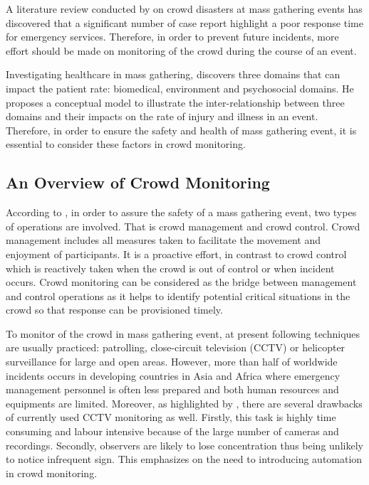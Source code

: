 A literature review conducted by \citet{Soomaroo2012} on crowd disasters at mass gathering events has discovered that a significant number of case report highlight a poor response time for emergency services. Therefore, in order to prevent future incidents, more effort should be made on monitoring of the crowd during the course of an event. 

Investigating healthcare in mass gathering, \citet{Arbon2004} discovers three domains that can impact the patient rate: biomedical, environment and psychosocial domains. He proposes a conceptual model to illustrate the inter-relationship between three domains and their impacts on the rate of injury and illness in an event. Therefore, in order to ensure the safety and health of mass gathering event, it is essential to consider these factors in crowd monitoring.

\subsection{An Overview of Crowd Monitoring}

According to \citet{Berlonghi1995}, in order to assure the safety of a mass gathering event, two types of operations are involved. That is crowd management and crowd control. Crowd management includes all measures taken to facilitate the movement and enjoyment of participants. It is a proactive effort, in contrast to crowd control which is reactively taken when the crowd is out of control or when incident occurs. Crowd monitoring can be considered as the bridge between management and control operations as it helps to identify potential critical situations in the crowd so that response can be provisioned timely.

To monitor of the crowd in mass gathering event, at present following techniques are usually practiced: patrolling, close-circuit television (CCTV) or helicopter surveillance for large and open areas. However, more than half of worldwide incidents occurs in developing countries in Asia and Africa \citep{BurkleJr2011} where emergency management personnel is often less prepared and both human resources and equipments are limited. Moreover, as highlighted by \citet{Davies1995}, there are several drawbacks of currently used CCTV monitoring as well. Firstly, this task is highly time consuming and labour intensive because of the large number of cameras and recordings. Secondly, observers are likely to lose concentration thus being unlikely to notice infrequent sign. This emphasizes on the need to introducing automation in crowd monitoring. 

